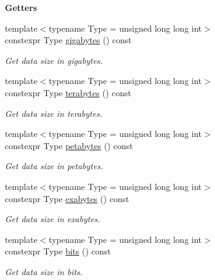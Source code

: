 \begin{Indent}{\bf Getters}
\begin{DoxyCompactItemize}
{\footnotesize template$<$typename Type  = unsigned long long int$>$ }\\constexpr Type \hyperlink{exceptionmagrathea_1_1DataSize_ac905eed152d52c88f8d6d097b00ac8c6}{gigabytes} () const 
\begin{DoxyCompactList}\small\item\em Get data size in gigabytes. \end{DoxyCompactList}\item 
{\footnotesize template$<$typename Type  = unsigned long long int$>$ }\\constexpr Type \hyperlink{exceptionmagrathea_1_1DataSize_afcf0c85f514e722667e76a197370f3ea}{terabytes} () const 
\begin{DoxyCompactList}\small\item\em Get data size in terabytes. \end{DoxyCompactList}\item 
{\footnotesize template$<$typename Type  = unsigned long long int$>$ }\\constexpr Type \hyperlink{exceptionmagrathea_1_1DataSize_a1e8e83135c301f096b7dc294fa537141}{petabytes} () const 
\begin{DoxyCompactList}\small\item\em Get data size in petabytes. \end{DoxyCompactList}\item 
{\footnotesize template$<$typename Type  = unsigned long long int$>$ }\\constexpr Type \hyperlink{exceptionmagrathea_1_1DataSize_af4290f1d8080c1923fc983aabcbc136e}{exabytes} () const 
\begin{DoxyCompactList}\small\item\em Get data size in exabytes. \end{DoxyCompactList}\item 
{\footnotesize template$<$typename Type  = unsigned long long int$>$ }\\constexpr Type \hyperlink{exceptionmagrathea_1_1DataSize_a544c4749e7d6f5ec6d990fedcdb36b66}{bits} () const 
\begin{DoxyCompactList}\small\item\em Get data size in bits. \end{DoxyCompactList}\end{DoxyCompactItemize}
\end{Indent}
